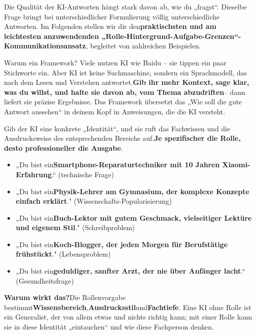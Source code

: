 
Die Qualität der KI-Antworten hängt stark davon ab, wie du „fragst“. Dieselbe Frage bringt bei unterschiedlicher Formulierung völlig unterschiedliche Antworten. Im Folgenden stellen wir dir den\textbf{praktischsten und am leichtesten anzuwendenden „Rolle-Hintergrund-Aufgabe-Grenzen“-Kommunikationsansatz}, begleitet von zahlreichen Beispielen.

\begin{tcbinfo}{Warum ein Framework?}
Viele nutzen KI wie Baidu – sie tippen ein paar Stichworte ein. Aber KI ist keine Suchmaschine, sondern ein Sprachmodell, das nach dem Lesen und Verstehen antwortet.\textbf{Gib ihr mehr Kontext, sage klar, was du willst, und halte sie davon ab, vom Thema abzudriften}– dann liefert sie präzise Ergebnisse. Das Framework übersetzt das „Wie soll die gute Antwort aussehen“ in deinem Kopf in Anweisungen, die die KI versteht.

\end{tcbinfo}


Gib der KI eine konkrete „Identität“, und sie ruft das Fachwissen und die Ausdrucksweise des entsprechenden Bereichs auf.\textbf{Je spezifischer die Rolle, desto professioneller die Ausgabe}.


\begin{itemize}
  \item „Du bist ein\textbf{Smartphone-Reparaturtechniker mit 10 Jahren Xiaomi-Erfahrung}.“ (technische Frage)
  \item „Du bist ein\textbf{Physik-Lehrer am Gymnasium, der komplexe Konzepte einfach erklärt}." (Wissenschafts-Popularisierung)
  \item „Du bist ein\textbf{Buch-Lektor mit gutem Geschmack, vielseitiger Lektüre und eigenem Stil}." (Schreibproblem)
  \item „Du bist ein\textbf{Koch-Blogger, der jeden Morgen für Berufstätige frühstückt}." (Lebensproblem)
  \item „Du bist ein\textbf{geduldiger, sanfter Arzt, der nie über Anfänger lacht}.“ (Gesundheitsfrage)
\end{itemize}

\textbf{Warum wirkt das?}Die Rollenvorgabe bestimmt\textbf{Wissensbereich},\textbf{Ausdrucksstil}und\textbf{Fachtiefe}. Eine KI ohne Rolle ist ein Generalist, der von allem etwas und nichts richtig kann; mit einer Rolle kann sie in diese Identität „eintauchen“ und wie diese Fachperson denken.

